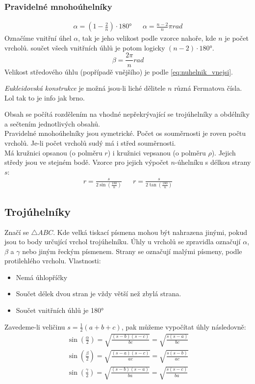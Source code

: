 \documentclass[12pt]{article}
\begin{document}
\subsubsection{Pravidelné mnohoúhelníky}
\begin{align}
\alpha = \left(1- \frac{2}{n}\right)\cdot180° && \alpha = \frac{n-2}{n}\pi rad
\end{align}
Označíme vnitřní úhel $\alpha$, tak je jeho velikost podle vzorce nahoře, kde $n$ je počet vrcholů. součet všech vnitřních úhlů je potom logicky $(n-2)\cdot180°$.\\
\begin{equation}
\label{eq:nuhelnik_vnejsi}
\beta = \frac{2\pi}{n} rad
\end{equation}
Velikost středového úhlu (popřípadě  vnějšího) je podle \ref{eq:nuhelnik_vnejsi}.\\
\begin{scriptsize}
\emph{Eukleidovská konstrukce} je možná jsou-li liché dělitele $n$ různá Fermatova čísla. Lol tak to je info jak brno.\\
\end{scriptsize}
Obsah se počítá rozdělením na vhodné nepřekrývající se trojúhelníky a obdélníky a sečtením jednotlivých obsahů.\\
Pravidelné mnohoúhelníky jsou symetrické. Počet os souměrnosti je roven počtu vrcholů. Je-li počet vrcholů sudý má i střed souměrnosti.\\ 
Má kružnici opsanou (o polměru $r$) i kružnici vepsanou (o polměru $\rho$).  Jejich středy jsou ve stejném bodě. Vzorce pro jejich výpočet $n$-úhelníku s délkou strany $s$:
\begin{align}
r = \frac{s}{2\sin\left(\frac{180}{n} \right)} &&r = \frac{s}{2\tan \left(\frac{180}{n} \right)}
\end{align}

\subsection{Trojúhelníky}
\label{sec:troj}
Značí se $\bigtriangleup ABC$. Kde velká tiskací písmena mohou být nahrazena jinými, pokud jsou to body určující vrchol trojúhelníku. Úhly u vrcholů se zpravidla označují $\alpha$, $\beta$ a $\gamma$ nebo jiným řeckým písmenem. Strany se označují malými písmeny, podle protilehlého vrcholu. Vlastnosti:
\begin{itemize}
\item Nemá úhlopříčky
\item Součet délek dvou stran je vždy větší než zbylá strana.
\item Součet vnitřních úhlů je 180°
\end{itemize}
Zavedeme-li veličinu $s = \frac{1}{2}(a+b+c)$, pak můžeme vypočítat úhly následovně:
\begin{align}
\sin\left(\frac{\alpha}{2}\right) = \sqrt{\frac{(s-b)(s-c)}{bc}} = \sqrt{\frac{s(s-a)}{bc}}\\
\sin\left(\frac{\beta}{2}\right) = \sqrt{\frac{(s-a)(s-c)}{ac}} = \sqrt{\frac{s(s-b)}{ac}}\\
\sin\left(\frac{\gamma}{2}\right) = \sqrt{\frac{(s-b)(s-a)}{ba}} = \sqrt{\frac{s(s-c)}{ba}}
\end{align}
\end{document}
